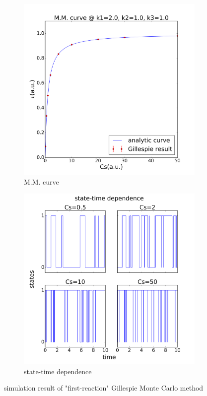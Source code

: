 	\begin{figure}[H]
		\centering
		\begin{subfigure}{0.46\textwidth}
		\includegraphics[scale=0.33]{img/MM2.png}
		\caption{M.M. curve}
		\end{subfigure}
		\begin{subfigure}{0.46\textwidth}
		\includegraphics[scale=0.33]{img/state2.png}
		\caption{state-time dependence}
		\end{subfigure}{}
		\caption{simulation result of "first-reaction" Gillespie Monte Carlo method}
		\label{img:first-reaction}
	\end{figure}

